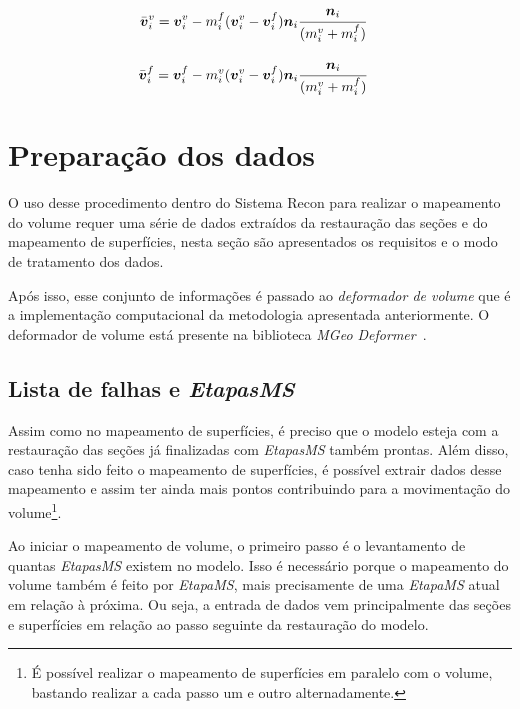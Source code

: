 \begin{align}
  &\bar{\boldsymbol{v}}_i^v = \boldsymbol{v}^v_i - m_i^f(\boldsymbol{v}^v_i - \boldsymbol{v}^f_i)\boldsymbol{n}_i \cfrac{\boldsymbol{n}_i}{(m_i^v+m_i^f)}
\end{align}

\begin{align}
  &\bar{\boldsymbol{v}}_i^f = \boldsymbol{v}^f_i - m_i^v(\boldsymbol{v}^v_i - \boldsymbol{v}^f_i)\boldsymbol{n}_i \cfrac{\boldsymbol{n}_i}{(m_i^v+m_i^f)}
\end{align}

\section{Preparação dos dados}

O uso desse procedimento dentro do Sistema Recon para realizar o mapeamento do volume requer uma série de dados extraídos da restauração das seções e do mapeamento de superfícies, nesta seção são apresentados os requisitos e o modo de tratamento dos dados.

Após isso, esse conjunto de informações é passado ao \emph{deformador de volume} que é a implementação computacional da metodologia apresentada anteriormente. O deformador de volume está presente na biblioteca \emph{MGeo Deformer}~\cite{Muller}.

\subsection{Lista de falhas e \emph{EtapasMS}}

Assim como no mapeamento de superfícies, é preciso que o modelo esteja com a restauração das seções já finalizadas com \emph{EtapasMS} também prontas. Além disso, caso tenha sido feito o mapeamento de superfícies, é possível extrair dados desse mapeamento e assim ter ainda mais pontos contribuindo para a movimentação do volume\footnote{É possível realizar o mapeamento de superfícies em paralelo com o volume, bastando realizar a cada passo um e outro alternadamente.}.

Ao iniciar o mapeamento de volume, o primeiro passo é o levantamento de quantas \emph{EtapasMS} existem no modelo. Isso é necessário porque o mapeamento do volume também é feito por \emph{EtapaMS}, mais precisamente de uma \emph{EtapaMS} atual em relação à próxima. Ou seja, a entrada de dados vem principalmente das seções e superfícies em relação ao passo seguinte da restauração do modelo.

